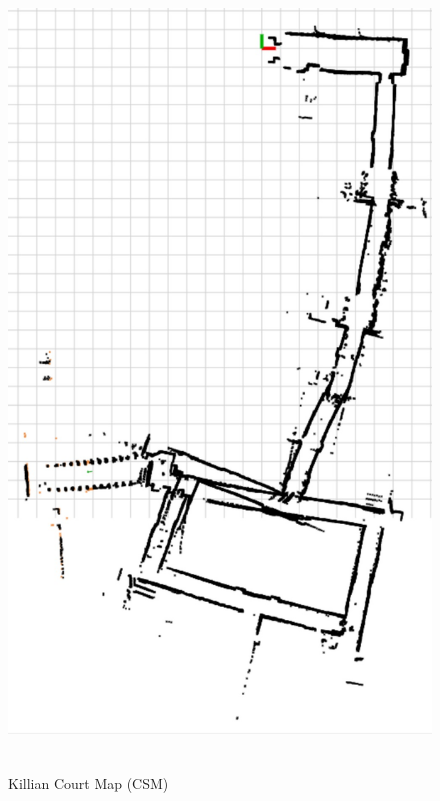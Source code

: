 \documentclass[11pt]{article}
\begin{document}
\begin{figure}[p]
\caption{Killian Court Map (CSM)}
\centering
\includegraphics[height=8in]{csm-killian.jpg}
\label{fig:csm}
\end{figure}
\end{document}

